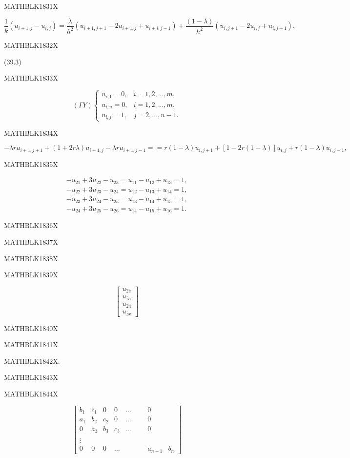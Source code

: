 \documentclass[
  ukrainian,
]{article}
\begin{document}
MATHBLK1831X

\[
\frac{1}{k} (u_{i+1, j} - u_{i, j}) = \frac{\lambda}{h^2} (u_{i+1, j+1} - 2u_{i+1, j} + u_{i+i, j-1}) + \frac{(1-\lambda)}{h^2} (u_{i, j+1} - 2u_{i, j} + u_{i, j-1}),
\]

MATHBLK1832X

(39.3)

MATHBLK1833X

\[
(\Gamma Y) \begin{cases} u_{i, 1} = 0, & i = 1, 2, ..., m, \\ u_{i, n} = 0, & i = 1, 2, ..., m, \\ u_{i, j} = 1, & j = 2, ..., n-1. \end{cases}
\]

MATHBLK1834X

\[
-\lambda r u_{i+1, j+1} + (1+2r\lambda) u_{i+1, j} - \lambda r u_{i+1, j-1} = = r(1-\lambda) u_{i, j+1} + [1-2r(1-\lambda)] u_{i, j} + r(1-\lambda) u_{i, j-1},
\]

MATHBLK1835X

\[
\begin{aligned} -u_{21}+3u_{22}-u_{23}=u_{11}-u_{12}+u_{13}=1,\\ -u_{22}+3u_{23}-u_{24}=u_{12}-u_{13}+u_{14}=1,\\ -u_{23}+3u_{24}-u_{25}=u_{13}-u_{14}+u_{15}=1,\\ -u_{24}+3u_{25}-u_{26}=u_{14}-u_{15}+u_{16}=1. \end{aligned}
\]

MATHBLK1836X

MATHBLK1837X

MATHBLK1838X

MATHBLK1839X

\[
\begin{bmatrix} u_{2\bar{z}} \\ u_{\bar{z}a} \\ u_{24} \\ u_{\bar{z}x} \end{bmatrix}
\]

MATHBLK1840X

MATHBLK1841X

MATHBLK1842X.

MATHBLK1843X

MATHBLK1844X

\[
\begin{bmatrix} b_1 & c_1 & 0 & 0 & \dots & & & 0 \\ a_1 & b_2 & c_2 & 0 & \dots & & & 0 \\ 0 & a_{\bar{z}} & b_3 & c_3 & \dots & & & 0 \\ & & & & & & & & \\ \vdots & & & & & & & & \\ 0 & 0 & 0 & \dots & & & & a_{n-1} & b_n \end{bmatrix}
\]
\end{document}
